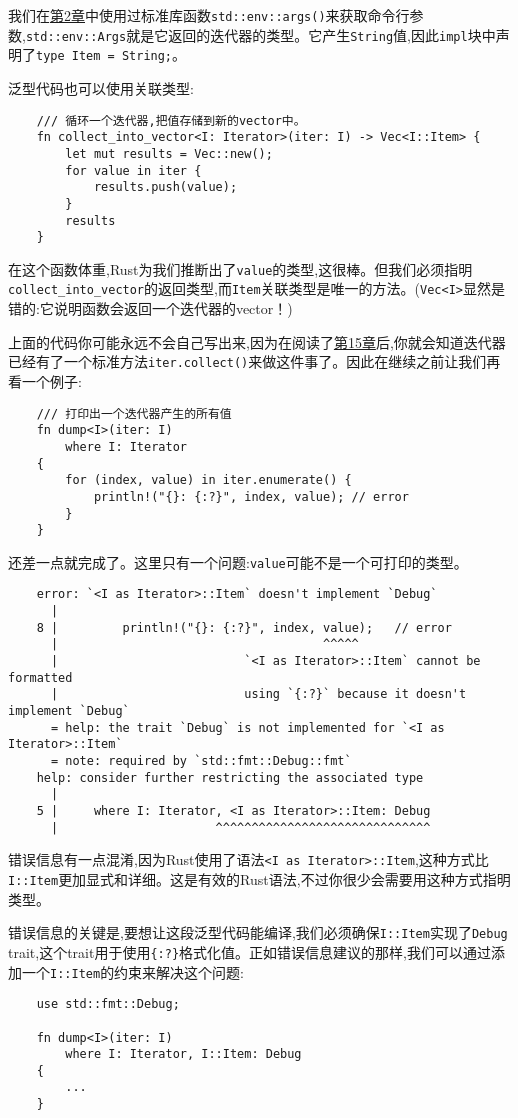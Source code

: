 我们在\hyperref[ch02]{第2章}中使用过标准库函数\texttt{std::env::args()}来获取命令行参数,\texttt{std::env::Args}就是它返回的迭代器的类型。它产生\texttt{String}值,因此\texttt{impl}块中声明了\texttt{type Item = String;}。

泛型代码也可以使用关联类型:
\begin{verbatim}
    /// 循环一个迭代器,把值存储到新的vector中。
    fn collect_into_vector<I: Iterator>(iter: I) -> Vec<I::Item> {
        let mut results = Vec::new();
        for value in iter {
            results.push(value);
        }
        results
    }
\end{verbatim}

在这个函数体重,Rust为我们推断出了\texttt{value}的类型,这很棒。但我们必须指明\texttt{collect\_into\_vector}的返回类型,而\texttt{Item}关联类型是唯一的方法。(\texttt{Vec<I>}显然是错的:它说明函数会返回一个迭代器的vector！)

上面的代码你可能永远不会自己写出来,因为在阅读了\hyperref[ch15]{第15章}后,你就会知道迭代器已经有了一个标准方法\texttt{iter.collect()}来做这件事了。因此在继续之前让我们再看一个例子:
\begin{verbatim}
    /// 打印出一个迭代器产生的所有值
    fn dump<I>(iter: I)
        where I: Iterator
    {
        for (index, value) in iter.enumerate() {
            println!("{}: {:?}", index, value); // error
        }
    }
\end{verbatim}

还差一点就完成了。这里只有一个问题:\texttt{value}可能不是一个可打印的类型。
\begin{verbatim}
    error: `<I as Iterator>::Item` doesn't implement `Debug`
      |
    8 |         println!("{}: {:?}", index, value);   // error
      |                                     ^^^^^
      |                          `<I as Iterator>::Item` cannot be formatted
      |                          using `{:?}` because it doesn't implement `Debug`
      = help: the trait `Debug` is not implemented for `<I as Iterator>::Item`
      = note: required by `std::fmt::Debug::fmt`
    help: consider further restricting the associated type
      |
    5 |     where I: Iterator, <I as Iterator>::Item: Debug
      |                      ^^^^^^^^^^^^^^^^^^^^^^^^^^^^^^
\end{verbatim}

错误信息有一点混淆,因为Rust使用了语法\texttt{<I as Iterator>::Item},这种方式比\texttt{I::Item}更加显式和详细。这是有效的Rust语法,不过你很少会需要用这种方式指明类型。

错误信息的关键是,要想让这段泛型代码能编译,我们必须确保\texttt{I::Item}实现了\texttt{Debug} trait,这个trait用于使用\texttt{\{:?\}}格式化值。正如错误信息建议的那样,我们可以通过添加一个\texttt{I::Item}的约束来解决这个问题:
\begin{verbatim}
    use std::fmt::Debug;

    fn dump<I>(iter: I)
        where I: Iterator, I::Item: Debug
    {
        ...
    }
\end{verbatim}

